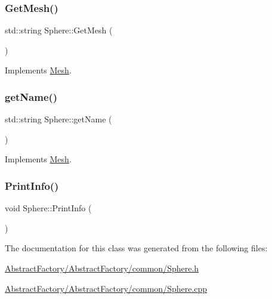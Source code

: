 \mbox{\label{class_sphere_afd7c86e5319c93163781df0e44cbfd49}} 
\subsubsection{\texorpdfstring{GetMesh()}{GetMesh()}}
{\footnotesize\ttfamily std\+::string Sphere\+::\+Get\+Mesh (\begin{DoxyParamCaption}{ }\end{DoxyParamCaption})\hspace{0.3cm}{\ttfamily [virtual]}}



Implements \mbox{\hyperlink{class_mesh_ac9a0bc76a4e34c3985cbc4c20692c7df}{Mesh}}.

\mbox{\label{class_sphere_a173e667086ecd8b9d972e1d6f9885d9d}} 
\subsubsection{\texorpdfstring{getName()}{getName()}}
{\footnotesize\ttfamily std\+::string Sphere\+::get\+Name (\begin{DoxyParamCaption}{ }\end{DoxyParamCaption})\hspace{0.3cm}{\ttfamily [virtual]}}



Implements \mbox{\hyperlink{class_mesh_aa131fe1c2586fe60988155db77c57272}{Mesh}}.

\mbox{\label{class_sphere_ac985fbbf5615eeec9252d2e6e9fc7fdf}} 
\subsubsection{\texorpdfstring{PrintInfo()}{PrintInfo()}}
{\footnotesize\ttfamily void Sphere\+::\+Print\+Info (\begin{DoxyParamCaption}{ }\end{DoxyParamCaption})}



The documentation for this class was generated from the following files\+:\begin{DoxyCompactItemize}
\item 
\mbox{\hyperlink{_abstract_factory_2_abstract_factory_2common_2_sphere_8h}{Abstract\+Factory/\+Abstract\+Factory/common/\+Sphere.\+h}}\item 
\mbox{\hyperlink{_abstract_factory_2_abstract_factory_2common_2_sphere_8cpp}{Abstract\+Factory/\+Abstract\+Factory/common/\+Sphere.\+cpp}}\end{DoxyCompactItemize}
